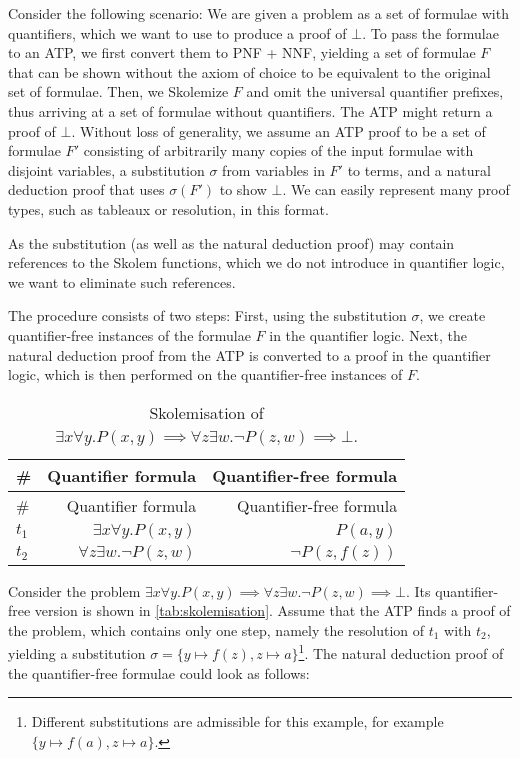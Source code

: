 \documentclass[]{article}
\begin{document}
Consider the following scenario: We are given a problem as a set of
formulae with quantifiers, which we want to use to produce a proof of
\(\bot\). To pass the formulae to an ATP, we first convert them to PNF +
NNF, yielding a set of formulae \(F\) that can be shown without the
axiom of choice to be equivalent to the original set of formulae. Then,
we Skolemize \(F\) and omit the universal quantifier prefixes, thus
arriving at a set of formulae without quantifiers. The ATP might return
a proof of \(\bot\). Without loss of generality, we assume an ATP proof
to be a set of formulae \(F'\) consisting of arbitrarily many copies of
the input formulae with disjoint variables, a substitution \(\sigma\)
from variables in \(F'\) to terms, and a natural deduction proof that
uses \(\sigma(F')\) to show \(\bot\). We can easily represent many proof
types, such as tableaux or resolution, in this format.

As the substitution (as well as the natural deduction proof) may contain
references to the Skolem functions, which we do not introduce in
quantifier logic, we want to eliminate such references.

The procedure consists of two steps: First, using the substitution
\(\sigma\), we create quantifier-free instances of the formulae \(F\) in
the quantifier logic. Next, the natural deduction proof from the ATP is
converted to a proof in the quantifier logic, which is then performed on
the quantifier-free instances of \(F\).

\begin{longtable}[c]{@{}lrr@{}}
\caption{Skolemisation of
\(\exists x \forall y. P(x, y) \implies  \forall z \exists w. \lnot P(z, w) \implies \bot\).
\label{tab:skolemisation}}\tabularnewline
\toprule
\# & Quantifier formula & Quantifier-free formula\tabularnewline
\midrule
\endfirsthead
\toprule
\# & Quantifier formula & Quantifier-free formula\tabularnewline
\midrule
\endhead
\(t_1\) & \(\exists x \forall y. P(x, y)\) & \(P(a, y)\)\tabularnewline
\(t_2\) & \(\forall z \exists w. \lnot P(z, w)\) &
\(\lnot P(z, f(z))\)\tabularnewline
\bottomrule
\end{longtable}

Consider the problem
\(\exists x \forall y. P(x, y) \implies \forall z \exists w. \lnot P(z, w) \implies \bot\).
Its quantifier-free version is shown in \autoref{tab:skolemisation}.
Assume that the ATP finds a proof of the problem, which contains only
one step, namely the resolution of \(t_1\) with \(t_2\), yielding a
substitution \(\sigma = \{ y \mapsto f(z), z \mapsto a \}\)\footnote{Different
  substitutions are admissible for this example, for example
  \(\{ y \mapsto f(a), z \mapsto a \}\).}. The natural deduction proof
of the quantifier-free formulae could look as follows: 
\end{document}

